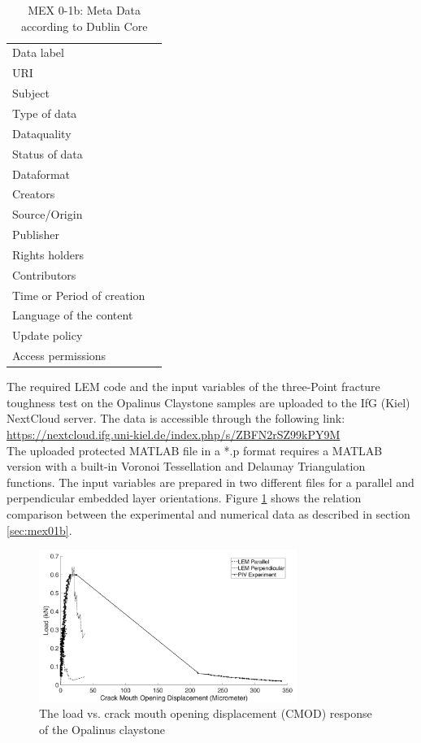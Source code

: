 \begin{table}[h!]
\caption{MEX 0-1b: Meta Data according to Dublin Core}
\label{tab:}
\small
\begin{tabular}{R{3cm}|L{7cm}}
\hline
%
Data label &  \\
URI &  \\
Subject  &  \\
Type of data  &  \\
Dataquality  &  \\
Status of data  &  \\
Dataformat  & \\
Creators  &  \\
Source/Origin &  \\
Publisher  &  \\
Rights holders &  \\
Contributors &  \\
Time or Period of creation &  \\
Language of the content &  \\
Update policy &  \\
Access permissions &  \\
%
\hline
\end{tabular}
\end{table}

The required LEM code and the input variables of the three-Point fracture toughness test on the Opalinus Claystone samples are uploaded to the IfG (Kiel) NextCloud server. The data is accessible through the following link:\\
\hyperlink{https://nextcloud.ifg.uni-kiel.de/index.php/s/ZBFN2rSZ99kPY9M}{https://nextcloud.ifg.uni-kiel.de/index.php/s/ZBFN2rSZ99kPY9M}\\

The uploaded protected MATLAB file in a *.p format requires a MATLAB version with a built-in Voronoi Tessellation and Delaunay Triangulation functions. The input variables are prepared in two different files for a parallel and perpendicular embedded layer orientations. Figure \ref{fig:Amir_ME1_LEM_Claystone_Data} shows the relation comparison between the experimental and numerical data as described in section \ref {sec:mex01b}.

\begin{figure}[!ht]
\centering
\includegraphics[width=0.75\textwidth]{figures/Amir_ME1_LEM_Claystone_Data.png}
\caption{The load vs. crack mouth opening displacement (CMOD) response of the Opalinus claystone}
\label{fig:Amir_ME1_LEM_Claystone_Data}
\end{figure}

